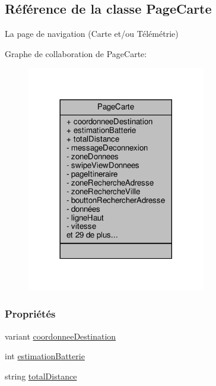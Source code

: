 \hypertarget{class_page_carte}{}\subsection{Référence de la classe Page\+Carte}
\label{class_page_carte}


La page de navigation (Carte et/ou Télémétrie)  




Graphe de collaboration de Page\+Carte\+:\nopagebreak
\begin{figure}[H]
\begin{center}
\leavevmode
\includegraphics[width=221pt]{class_page_carte__coll__graph}
\end{center}
\end{figure}
\subsubsection*{Propriétés}
\begin{DoxyCompactItemize}
\item 
variant \hyperlink{class_page_carte_ae010768ed12ad9729c2c9b62469212e6}{coordonnee\+Destination}
\item 
int \hyperlink{class_page_carte_a6881b3f806dbfe3c5d187458e57d25b9}{estimation\+Batterie}
\item 
string \hyperlink{class_page_carte_ac82c3aebfbfa75f8da8cd1add5b18339}{total\+Distance}
\end{DoxyCompactItemize}
